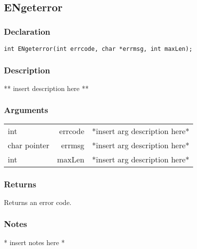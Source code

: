 \subsection{ENgeterror}
\subsubsection{Declaration}
\begin{lstlisting}
int ENgeterror(int errcode, char *errmsg, int maxLen);
\end{lstlisting}
\subsubsection{Description}
** insert description here **
\subsubsection{Arguments}
\begin{tabular}{l r p{11cm} }
int&errcode&*insert arg description here* \\[6pt]
char pointer&errmsg&*insert arg description here* \\[6pt]
int&maxLen&*insert arg description here* \\[6pt]
\end{tabular}
\subsubsection{Returns}
Returns an error code.
\subsubsection{Notes}
* insert notes here *